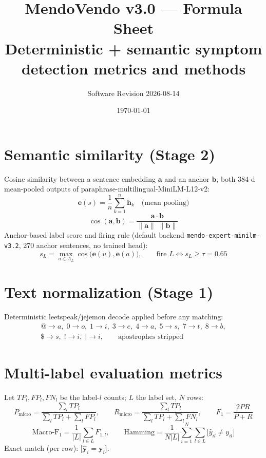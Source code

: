 \documentclass[11pt]{article}
\title{MendoVendo v3.0 — Formula Sheet\\ \large Deterministic + semantic symptom detection metrics and methods}
\author{Software Revision 2026-08-14}
\date{\today}
\begin{document}
\maketitle

\section{Semantic similarity (Stage 2)}
Cosine similarity between a sentence embedding $\mathbf{a}$ and an anchor
$\mathbf{b}$, both 384-d mean-pooled outputs of
paraphrase-multilingual-MiniLM-L12-v2:
\begin{equation}
\mathbf{e}(s) = \frac{1}{n}\sum_{k=1}^{n}\mathbf{h}_k
\quad\text{(mean pooling)}
\end{equation}
\begin{equation}
\cos(\mathbf{a},\mathbf{b}) = \frac{\mathbf{a}\cdot\mathbf{b}}
{\|\mathbf{a}\|\;\|\mathbf{b}\|}
\end{equation}
Anchor-based label score and firing rule (default backend
\texttt{mendo-expert-minilm-v3.2}, 270 anchor sentences, no trained head):
\begin{equation}
s_L = \max_{a \in A_L} \cos\big(\mathbf{e}(u), \mathbf{e}(a)\big),
\qquad \text{fire } L \iff s_L \geq \tau = 0.65
\end{equation}

\section{Text normalization (Stage 1)}
Deterministic leetspeak/jejemon decode applied before any matching:
\begin{equation}
\begin{array}{l}
@\to a,\; 0\to o,\; 1\to i,\; 3\to e,\; 4\to a,\; 5\to s,\; 7\to t,\; 8\to b,\\
\$\to s,\; !\to i,\; |\to i,\qquad \text{apostrophes stripped}
\end{array}
\end{equation}

\section{Multi-label evaluation metrics}
Let $TP_l, FP_l, FN_l$ be the label-$l$ counts; $L$ the label set, $N$ rows:
\begin{equation}
P_{\mathrm{micro}} = \frac{\sum_l TP_l}{\sum_l TP_l + \sum_l FP_l},
\qquad
R_{\mathrm{micro}} = \frac{\sum_l TP_l}{\sum_l TP_l + \sum_l FN_l},
\qquad
F_1 = \frac{2 P R}{P + R}
\end{equation}
\begin{equation}
\mathrm{Macro\text{-}F_1} = \frac{1}{|L|}\sum_{l\in L} F_{1,l},
\qquad
\mathrm{Hamming} = \frac{1}{N|L|}\sum_{i=1}^{N}\sum_{l\in L}
\big[\hat{y}_{il} \neq y_{il}\big]
\end{equation}
Exact match (per row): $\big[\hat{\mathbf{y}}_i = \mathbf{y}_i\big]$.
\end{document}
